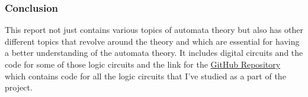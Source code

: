 \documentclass{report}
\begin{document}
\subsubsection{\Large Conclusion}
This report not just contains various topics of automata theory but also has other different topics that revolve around the theory and which are essential for having a better understanding of the automata theory. It includes digital circuits and the code for some of those logic circuits and the link for the \href{https://github.com/Liza23/Summer-of-Science_Automata-Theory}{GitHub Repository} which contains code for all the logic circuits that I've studied as a part of the project.  
\end{document}
